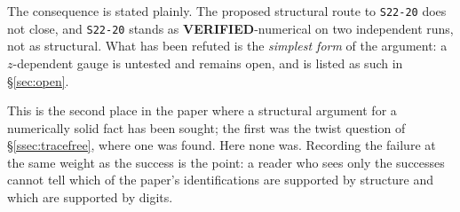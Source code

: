 The consequence is stated plainly. The proposed structural route to
\texttt{S22-20} does not close, and \texttt{S22-20} stands as
\textbf{VERIFIED}-numerical on two independent runs, not as structural. What
has been refuted is the \emph{simplest form} of the argument: a $z$-dependent
gauge is untested and remains open, and is listed as such in
\S\ref{sec:open}.

This is the second place in the paper where a structural argument for a
numerically solid fact has been sought; the first was the twist question of
\S\ref{ssec:tracefree}, where one was found. Here none was. Recording the
failure at the same weight as the success is the point: a reader who sees only
the successes cannot tell which of the paper's identifications are supported by
structure and which are supported by digits.
